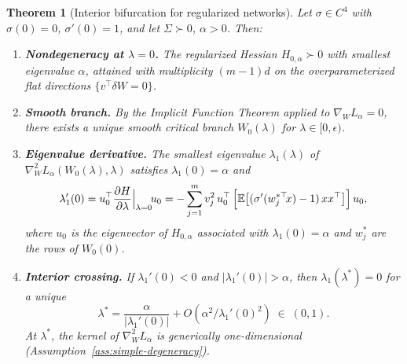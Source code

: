 \documentclass[11pt, reqno]{amsart}
\theoremstyle{plain}
\newtheorem{theorem}{Theorem}[section]
\theoremstyle{definition}
\theoremstyle{remark}
\begin{document}
\begin{theorem}[Interior bifurcation for regularized networks]\label{thm:interior-bif}
Let $\sigma\in C^4$ with $\sigma(0)=0$, $\sigma'(0)=1$, and let $\Sigma\succ 0$, $\alpha>0$.  Then:
\begin{enumerate}[label=(\roman*)]
\item \textbf{Nondegeneracy at $\lambda=0$.}
The regularized Hessian $H_{0,\alpha}\succ 0$ with smallest eigenvalue $\alpha$, attained with multiplicity $(m-1)d$ on the overparameterized flat directions $\{v^\top\delta W=0\}$.

\item \textbf{Smooth branch.}
By the Implicit Function Theorem applied to $\nabla_W L_\alpha=0$, there exists a unique smooth critical branch $W_0(\lambda)$ for $\lambda\in[0,\epsilon)$.

\item \textbf{Eigenvalue derivative.}
The smallest eigenvalue $\lambda_1(\lambda)$ of $\nabla_W^2 L_\alpha(W_0(\lambda),\lambda)$ satisfies $\lambda_1(0)=\alpha$ and
\begin{equation}\label{eq:eigenvalue-deriv}
  \lambda_1'(0)=u_0^\top \frac{\partial H}{\partial\lambda}\Big|_{\lambda=0}\! u_0
  =-\sum_{j=1}^m v_j^2\,u_0^\top\,\Bigl[\mathbb E\bigl[(\sigma'(w_j^{*\top}\!x)-1)\,xx^\top\bigr]\Bigr]\,u_0,
\end{equation}
where $u_0$ is the eigenvector of $H_{0,\alpha}$ associated with $\lambda_1(0)=\alpha$ and $w_j^*$ are the rows of $W_0(0)$.

\item \textbf{Interior crossing.}
If $\lambda_1'(0)<0$ and $|\lambda_1'(0)|>\alpha$, then $\lambda_1(\lambda^*)=0$ for a unique
\begin{equation}\label{eq:lam-star-formula}
  \lambda^*=\frac{\alpha}{|\lambda_1'(0)|}+O(\alpha^2/\lambda_1'(0)^2)\;\in\;(0,1).
\end{equation}
At $\lambda^*$, the kernel of $\nabla_W^2 L_\alpha$ is generically one-dimensional (Assumption~\ref{ass:simple-degeneracy}).
\end{enumerate}
\end{theorem}
\end{document}
